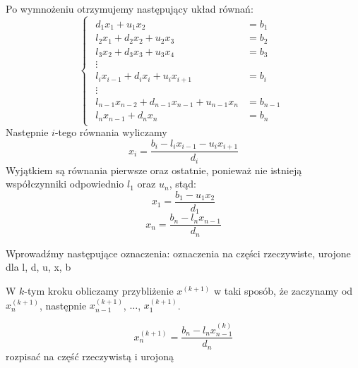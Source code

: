 \documentclass[12pt]{article}
\begin{document}
	Po wymnożeniu otrzymujemy następujący układ równań:
	\[
	\begin{cases}
		\begin{aligned}
			d_1 x_1 + u_1 x_2                               & = b_1     \\
			l_2 x_1 + d_2 x_2 + u_2 x_3                     & = b_2     \\
			l_3 x_2 + d_3 x_3 + u_3 x_4                     & = b_3     \\
			\vdots    \hspace{1em}                          &  \\
			l_i x_{i-1} + d_i x_i + u_i x_{i+1}             & = b_i     \\
			\vdots        \hspace{1em}                      &  \\
			l_{n-1} x_{n-2} + d_{n-1} x_{n-1} + u_{n-1} x_n & = b_{n-1} \\
			l_n x_{n-1} + d_n x_n                           & = b_n
		\end{aligned}
	\end{cases}
	\]
	Następnie $i$-tego równania wyliczamy
	$$
	x_i = \frac{b_i - l_i x_{i-1} - u_i x_{i+1}}{d_i}
	$$
	Wyjątkiem są równania pierwsze oraz ostatnie, ponieważ nie istnieją współczynniki odpowiednio $l_1$ oraz $u_n$, stąd:
	$$
	x_1 = \frac{b_1 - u_1 x_2}{d_1}
	$$
	$$
	x_n = \frac{b_n - l_n x_{n-1}}{d_n}
	$$
	
	Wprowadźmy następujące oznaczenia:
	oznaczenia na części rzeczywiste, urojone dla l, d, u, x, b
	
	W $k$-tym kroku obliczamy przybliżenie $x^{(k+1)}$ w taki sposób, że zaczynamy od $x^{(k+1)}_n$, następnie $x^{(k+1)}_{n-1}$, $\dots$, $x^{(k+1)}_1$.
	
	$$
	x^{(k+1)}_n = \frac{b_n - l_n x^{(k)}_{n-1}}{d_n}
	$$
	rozpisać na część rzeczywistą i urojoną
	
	
\end{document}
